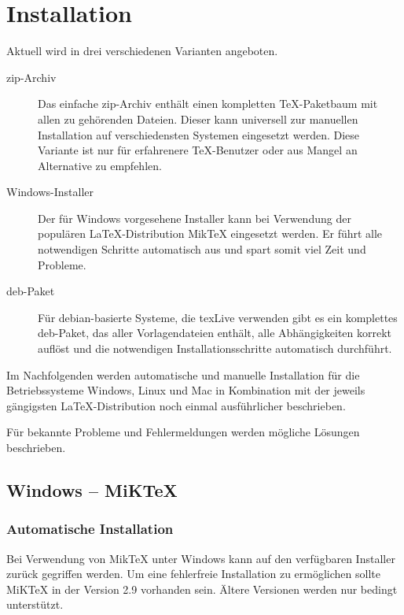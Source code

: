 \chapter{Installation}\label{chap:install}

Aktuell wird \tubslatex in drei verschiedenen Varianten angeboten.

\begin{description}
  \item[zip-Archiv]
    Das einfache zip-Archiv enthält einen kompletten \TeX-Paketbaum mit
    allen zu \tubslatex gehörenden Dateien.
    Dieser kann universell zur manuellen Installation auf verschiedensten
    Systemen eingesetzt werden.
    Diese Variante ist nur für erfahrenere  \TeX-Benutzer oder aus Mangel
    an Alternative zu empfehlen.
  \item[Windows-Installer]
    Der für Windows vorgesehene Installer kann bei Verwendung der
    populären \LaTeX-Distribution MikTeX eingesetzt werden.
    Er führt alle notwendigen Schritte automatisch aus und spart somit
    viel Zeit und Probleme.
  \item[deb-Paket]
    Für debian-basierte Systeme, die texLive verwenden gibt es
    ein komplettes deb-Paket, das aller Vorlagendateien enthält,
    alle Abhängigkeiten korrekt auflöst und die notwendigen
    Installationsschritte automatisch durchführt.
\end{description}

Im Nachfolgenden werden automatische und manuelle Installation für
die Betriebssysteme Windows, Linux und Mac in Kombination mit der
jeweils gängigsten \LaTeX-Distribution noch einmal ausführlicher
beschrieben.

Für bekannte Probleme und Fehlermeldungen werden mögliche Lösungen beschrieben.

\clearpage
\section{Windows -- MiKTeX}

\subsection{Automatische Installation}


Bei Verwendung von MikTeX unter Windows kann auf den verfügbaren Installer
zurück gegriffen werden. Um eine fehlerfreie Installation zu ermöglichen
sollte MiKTeX in der Version 2.9 vorhanden sein.
Ältere Versionen werden nur bedingt unterstützt.


